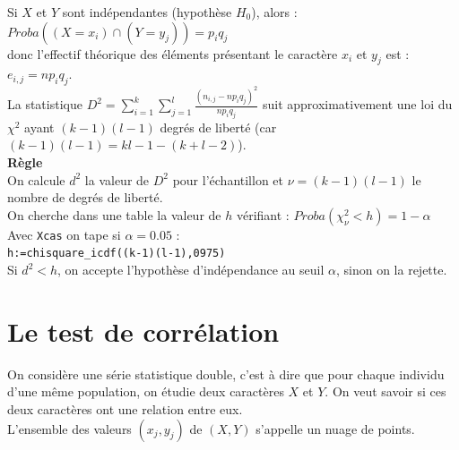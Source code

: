 \documentclass[a4paper,11pt]{book}
\begin{document}
Si $X$ et $Y$ sont ind\'ependantes (hypoth\`ese $H_0$), alors :\\
$Proba((X=x_i)\cap (Y=y_j))=p_iq_j $ \\
donc l'effectif th\'eorique des
 \'el\'ements pr\'esentant le caract\`ere $x_i$ et $y_j$ est :\\
$ e_{i,j}=np_iq_j$.\\
La statistique 
$\displaystyle D^2=\sum_{i=1}^k\sum_{j=1}^l\frac{(n_{i,j}-np_iq_j)^2}{np_iq_j}$
 suit approximativement  une loi  du $\chi^2$ ayant $(k-1)(l-1)$ degr\'es 
de libert\'e (car $(k-1)(l-1)=kl-1-(k+l-2)$).\\
{\bf R\`egle}\\
On calcule $d^2$ la valeur de $D^2$ pour l'\'echantillon et  $\nu=(k-1)(l-1)$ 
le nombre de degr\'es de libert\'e.\\
On cherche dans une table la valeur de $h$ v\'erifiant :
 $Proba(\chi_{\nu}^2<h)=1-\alpha$ \\
Avec {\tt Xcas} on tape si $\alpha=0.05$ :\\
{\tt h:=chisquare\_icdf((k-1)(l-1),0975)}\\
Si $d^2<h$, on accepte l'hypoth\`ese d'ind\'ependance au seuil $\alpha$, 
sinon on la rejette.
\section{Le test de corr\'elation}
On consid\`ere une s\'erie statistique double, c'est \`a dire que pour chaque 
individu d'une m\^eme population, on \'etudie deux caract\`eres $X$ et $Y$.
On veut savoir si ces deux caract\`eres ont une relation entre eux.\\
L'ensemble des valeurs $(x_j,y_j)$ de $(X,Y)$ s'appelle un nuage de points.
\end{document}
